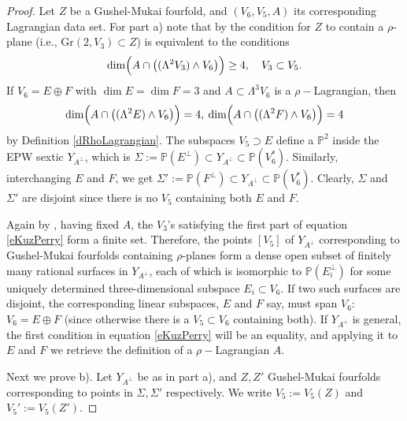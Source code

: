 \documentclass[11pt]{amsart}
\theoremstyle{plain}
\numberwithin{equation}{section}
\theoremstyle{definition}
\theoremstyle{remark}
\newcommand{\bP}{\mathbb{P}}
\begin{document}
\begin{proof}
Let $Z$ be a Gushel-Mukai fourfold, and $(V_6, V_5,A)$ its corresponding Lagrangian data set. For part a) note that by \cite[Remark 5.1]{KuzPerry} the condition for $Z$ to contain a $\rho$-plane (i.e., $\mathrm{Gr}(2, V_3) \subset Z$) is equivalent to the conditions
\begin{equation}\label{eKuzPerry}
\dim \Bigl( A \cap \bigl( (\Lambda^2 V_3)\wedge V_6 \bigr) \Bigr) \ge 4, \quad V_3 \subset V_5 .
\end{equation}
If $V_6 =E \oplus F$ with $\dim E =\dim F=3$ and $A \subset \Lambda^3 V_6$ is a $\rho-$Lagrangian, then 
\[
\dim \Bigl( A \cap \bigl( (\Lambda^2 E)\wedge V_6 \bigr) \Bigr) = 4, \: \dim \Bigl( A \cap \bigl( (\Lambda^2 F)\wedge V_6 \bigr) \Bigr) = 4
\]
by Definition \ref{dRhoLagrangian}. The subspaces $V_5 \supset E$ define a $\bP^2$ inside the EPW sextic $Y_{A^{\perp}}$, which is $\Sigma:=\bP(E^{\perp}) \subset Y_{A^{\perp} }\subset \bP(V_6^*)$. Similarly, interchanging $E$ and $F$, we get $\Sigma':= \bP(F^{\perp}) \subset Y_{A^{\perp} }\subset \bP(V_6^*)$. Clearly, $\Sigma$ and $\Sigma'$ are disjoint since there is no $V_5$ containing both $E$ and $F$. 

Again by \cite[Remark 5.1]{KuzPerry}, having fixed $A$, the $V_3$'s satisfying the first part of equation \ref{eKuzPerry} form a finite set. Therefore, the points $[V_5]$ of $Y_{A^{\perp}}$ corresponding to Gushel-Mukai fourfolds containing $\rho$-planes form a dense open subset of finitely many rational surfaces in $Y_{A^{\perp}}$, each of which is isomorphic to $\bP(E_i^{\perp})$ for some uniquely determined three-dimensional subspace $E_i \subset V_6$. If two such surfaces are disjoint, the corresponding linear subspaces, $E$ and $F$ say, must span $V_6$: $V_6 =E\oplus F$ (since otherwise there is a $V_5\subset V_6$ containing both). If $Y_{A^{\perp}}$ is general, the first condition in equation \ref{eKuzPerry} will be an equality, and applying it to $E$ and $F$ we retrieve the definition of a $\rho-$Lagrangian $A$. 

\medskip

Next we prove b). Let $Y_{A^\perp}$ be as in part a), and $Z,Z'$ Gushel-Mukai fourfolds corresponding to points in $\Sigma, \Sigma'$ respectively. We write $V_5:=V_5(Z)$ and $V_5':=V_5(Z')$. 


\end{proof}
\end{document}

